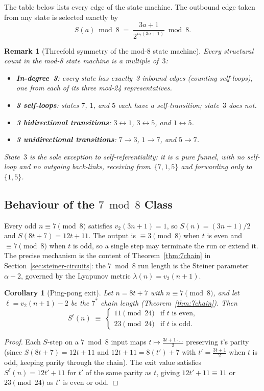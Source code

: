 \documentclass[11pt,a4paper]{article}
\newtheorem{corollary}[theorem]{Corollary}
\theoremstyle{remark}
\theoremstyle{plain}
\newtheorem{remark}[theorem]{Remark}
\begin{document}
The table below lists every edge of the state machine.
The outbound edge taken from any state is selected exactly by
\[
  S(a) \bmod 8 \;=\; \frac{3a+1}{2^{v_2(3a+1)}} \bmod 8.
\]


\begin{remark}[Threefold symmetry of the mod-8 state machine]
Every structural count in the mod-8 state machine is a multiple of~$3$:
\begin{itemize}
  \item \textbf{In-degree~3}: every state has exactly~3 inbound edges (counting
    self-loops), one from each of its three mod-24 representatives.
  \item \textbf{3 self-loops}: states $7$, $1$, and $5$ each have a self-transition;
    state~$3$ does not.
  \item \textbf{3 bidirectional transitions}: $3\leftrightarrow1$,
    $3\leftrightarrow5$, and $1\leftrightarrow5$.
  \item \textbf{3 unidirectional transitions}: $7\to3$, $1\to7$, and $5\to7$.
\end{itemize}
State~$3$ is the sole exception to self-referentiality: it is a pure funnel,
with no self-loop and no outgoing back-links, receiving from~$\{7,1,5\}$ and
forwarding only to~$\{1,5\}$.
\end{remark}

\subsection{Behaviour of the $7 \bmod 8$ Class}
\label{sec:mod8-seven}

Every odd $n \equiv 7 \pmod{8}$ satisfies $v_2(3n+1) = 1$, so
$S(n) = (3n+1)/2$ and $S(8t+7) = 12t+11$.
The output is $\equiv 3 \pmod{8}$ when $t$ is even and $\equiv 7 \pmod{8}$ when $t$
is odd, so a single step may terminate the run or extend it.
The precise mechanism is the content of Theorem~\ref{thm:7chain} in
Section~\ref{sec:steiner-circuits}: the $7 \bmod 8$ run length is the Steiner
parameter $\alpha - 2$, governed by the Lyapunov metric $\lambda(n) = v_2(n+1)$.

\begin{corollary}[Ping-pong exit]
\label{cor:pingpong}
Let $n = 8t+7$ with $n \equiv 7 \pmod{8}$, and let $\ell = v_2(n+1)-2$ be the
$7^*$ chain length (Theorem~\ref{thm:7chain}). Then
\[
  S^{\ell}(n) \;\equiv\; \begin{cases} 11 \pmod{24} & \text{if } t \text{ is even,} \\
  23 \pmod{24} & \text{if } t \text{ is odd.} \end{cases}
\]
\end{corollary}
\begin{proof}
Each $S$-step on a $7 \bmod 8$ input maps $t \mapsto \frac{3t+1 \cdot \ldots}{2}$
preserving $t$'s parity (since $S(8t+7) = 12t+11$ and $12t+11 = 8(t') + 7$ with
$t' = \frac{3t+1}{2}$ when $t$ is odd, keeping parity through the chain).
The exit value satisfies $S^\ell(n) = 12t'+11$ for $t'$ of the same parity as $t$,
giving $12t'+11 \equiv 11$ or $23 \pmod{24}$ as $t'$ is even or odd.
\end{proof}
\end{document}
